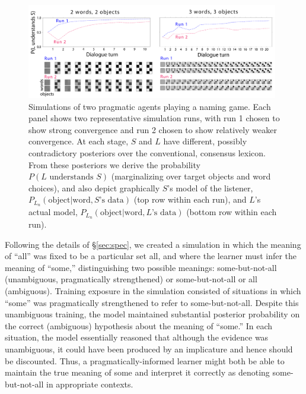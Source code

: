 \documentclass{article} %
\newcommand{\word}{\text{word}}
\newcommand{\obj}{\text{object}}
\begin{document}
\begin{figure}[t]
\centering
\includegraphics[width=0.98\textwidth]{figures/emergence-composite.pdf}
\caption{\label{fig:emergence} Simulations of two pragmatic agents
  playing a naming game. Each panel shows two representative
  simulation runs, with run 1 chosen to show strong convergence and
  run 2 chosen to show relatively weaker convergence. At each stage,
  $S$ and $L$ have different, possibly contradictory posteriors over
  the conventional, consensus lexicon. From these posteriors we derive
  the probability $P(\text{$L$ understands $S$})$ (marginalizing over
  target objects and word choices), and also depict graphically $S$'s
  model of the listener, $P_{L_n}(\obj | \word, \text{$S$'s data})$
  (top row within each run),
  and $L$'s actual model, $P_{L_n}(\obj | \word, \text{$L$'s
    data})$ (bottom row within each run). }
\end{figure}

Following the details of \S\ref{sec:spec}, we created a simulation in
which the meaning of ``all'' was fixed to be a particular set {\sc
  all}, and where the learner must infer the meaning of ``some,''
distinguishing two possible meanings: {\sc some-but-not-all}
(unambiguous, 
pragmatically strengthened) or
{\sc some-but-not-all or all} (ambiguous). Training exposure in the
simulation consisted of situations in which ``some'' was pragmatically
strengthened to refer to {\sc some-but-not-all}. Despite this
unambiguous training, the model maintained substantial
posterior probability on the correct (ambiguous) hypothesis about the
meaning of ``some.'' In each
situation, the model essentially reasoned that although the evidence
was unambiguous, it could have been produced by an implicature and
hence should be discounted. Thus, a pragmatically-informed learner
might both be able to maintain the true meaning of {\sc some} and
interpret it correctly as denoting {\sc some-but-not-all} in
appropriate contexts. 
\end{document}
